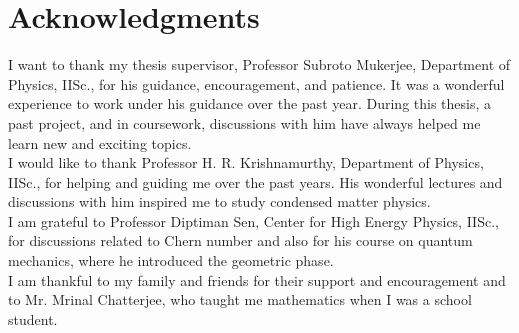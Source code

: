 \documentclass{report}
\begin{document}
\maketitle



%


\chapter*{\center Acknowledgments}%
%
I want to thank my thesis supervisor, Professor Subroto Mukerjee, Department of Physics, IISc., for his guidance, encouragement, and patience. It was a wonderful experience to work under his guidance over the past year. During this thesis, a past project, and in coursework, discussions with him have always helped me learn new and exciting topics. \\

I would like to thank Professor H. R. Krishnamurthy, Department of Physics, IISc., for helping and guiding me over the past years. His wonderful lectures and discussions with him inspired me to study condensed matter physics.\\

I am grateful to Professor Diptiman Sen, Center for High Energy Physics, IISc., for discussions related to Chern number and also for his course on quantum mechanics, where he introduced the geometric phase.\\

I am thankful to my family and friends for their support and encouragement and to Mr. Mrinal Chatterjee, who taught me mathematics when I was a school student.
\end{document}
